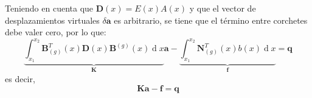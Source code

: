 \documentclass[12pt,letterpaper,landscape]{article}
\newcommand{\ve}[1]{{\boldsymbol{#1}}}
\newcommand{\ma}[1]{{\boldsymbol{#1}}}
\newcommand{\dd}{\operatorname{d} \!}
\begin{document}
Teniendo en cuenta que $\ma{D}(x) = E(x) A(x)$ y que el vector de desplazamientos virtuales $\delta \ma{a}$ es arbitrario, se tiene que el término entre corchetes debe valer cero, por lo que:
\begin{equation}
\underbrace{\int_{x_1}^{x_2} \ma{B}_{(g)}^T(x) \ma{D}(x) \ma{B}^{(g)}(x) \dd x}_{\ma{K}} \ve{a} 
- \underbrace{\int_{x_1}^{x_2}  \ma{N}_{(g)}^T(x) b(x) \dd x}_{\ma{f}} 
= \ma{q}
\end{equation}
es decir,
\begin{equation}
\ma{K}\ve{a} - \ma{f} = \ma{q}
\end{equation}
\end{document}
